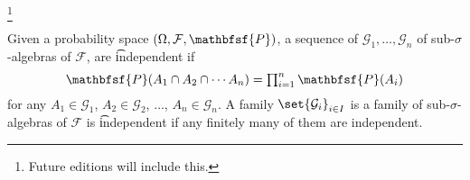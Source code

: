 
  \ifhmode\unskip\fi\footnote{
Future editions will include this.
  }


Given a probability space $(\Omega , \mathcal{F} , \mathbfsf{P} )$, a sequence of $\mathcal{G} _1, \dots, \mathcal{G} _n$ of sub-$\sigma $-algebras of $\mathcal{F} $, are \t{independent} if
  \[
\textstyle
\mathbfsf{P} (A_1 \cap A_2 \cap \cdots A_n) = \prod_{i = 1}^{n} \mathbfsf{P} (A_i)
  \]
for any $A_1 \in \mathcal{G} _1$, $A_2 \in \mathcal{G} _2$, $\dots$, $A_n \in \mathcal{G} _n$.
A family $\set{\mathcal{G} _i}_{i \in I}$ is a family of sub-$\sigma $-algebras of $\mathcal{F} $ is \t{independent} if any finitely many of them are independent.

\blankpage

